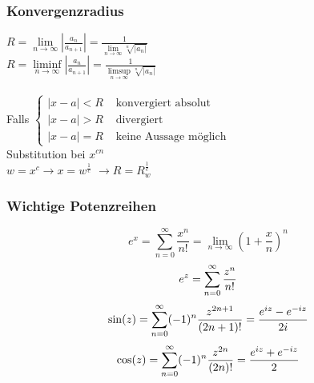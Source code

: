 \documentclass[6pt,a4paper]{scrartcl}
\newcommand{\abs}[1]{\ensuremath{\left\vert#1\right\vert}}
\newcommand{\enbrace}[1]{\ensuremath{\left(#1\right)}}
\begin{document}
\begin{multicols*}{4}
\subsubsection{Konvergenzradius}
$R = \lim\limits_{n\rightarrow \infty} \abs{\frac{a_n}{a_{n+1}}}=\frac{1}{\lim\limits_{n\rightarrow \infty}\sqrt[n]{\abs{a_n}}}$ \\
$R =\liminf\limits_{n\rightarrow \infty} \abs{\frac{a_n}{a_{n+1}}}=\frac{1}{\limsup\limits_{n\rightarrow \infty}\sqrt[n]{\abs{a_n}}}$ \\ \\
Falls $\begin{cases} 
	\abs{x-a} < R & \text{ konvergiert absolut}\\
	\abs{x-a} > R & \text{ divergiert} \\
	\abs{x-a} = R & \text{ keine Aussage möglich}
	\end{cases}$\\
Substitution bei $x^{cn}$ \\
$w=x^c \rightarrow x=w^\frac{1}{c}$
$\rightarrow R=R_w^\frac{1}{c}$

\subsubsection{Wichtige Potenzreihen}
\label{sub:potenzreihen}
\begin{equation}
 	e^x = \sum_{n = 0}^{\infty} \frac{x^n}{n!} = \lim\limits_{n\to\infty}\enbrace{1+\frac{x}{n}}^n
\end{equation}
\begin{equation}
 	e^z = \sum_{n = 0}^{\infty} \frac{z^n}{n!} \\
\end{equation}
\begin{equation}
	 \sin (z) = \sum_{n = 0}^{\infty} (-1)^n \frac{z^{2n +1}}{(2n +1)!} = \frac{e^{iz} - e^{-iz}}{2i} \\
\end{equation}
\begin{equation}
	 \cos (z) = \sum_{n = 0}^{\infty} (-1)^n \frac{z^{2n}}{(2n)!} = \frac{e^{iz} + e^{-iz}}{2}\\
 \end{equation}






\end{multicols*}
\end{document}
